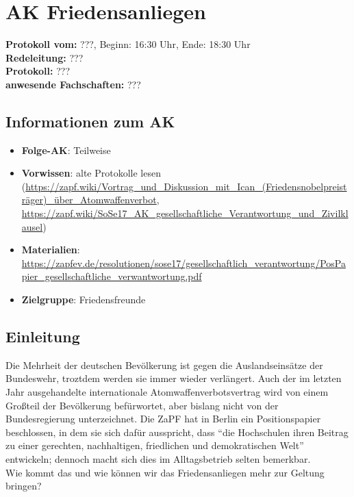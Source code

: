 
\section{AK Friedensanliegen}

	\textbf{Protokoll vom:} ???,
	Beginn: 16:30 Uhr,
	Ende: 18:30 Uhr \\
	\textbf{Redeleitung:} ??? \\
	\textbf{Protokoll:} ??? \\
	\textbf{anwesende Fachschaften:} ???

	\subsection*{Informationen zum AK}
		\begin{itemize}
			\item \textbf{Folge-AK}: Teilweise
			\item \textbf{Vorwissen}: alte Protokolle lesen (\url{https://zapf.wiki/Vortrag_und_Diskussion_mit_Ican_(Friedensnobelpreisträger)_über_Atomwaffenverbot}, \url{https://zapf.wiki/SoSe17_AK_gesellschaftliche_Verantwortung_und_Zivilklausel})
      		\item \textbf{Materialien}: \url{https://zapfev.de/resolutionen/sose17/gesellschaftlich_verantwortung/PosPapier_gesellschaftliche_verwantwortung.pdf}
			\item \textbf{Zielgruppe}: Friedensfreunde
		\end{itemize}

  \subsection{Einleitung}
    Die Mehrheit der deutschen Bevölkerung ist gegen die Auslandseinsätze der Bundeswehr, troztdem werden sie immer wieder verlängert. Auch der im letzten Jahr ausgehandelte internationale Atomwaffenverbotsvertrag wird von einem Großteil der Bevölkerung befürwortet, aber bislang nicht von der Bundesregierung unterzeichnet. Die ZaPF hat in Berlin ein Positionspapier beschlossen, in dem sie sich dafür ausspricht, dass ``die Hochschulen ihren Beitrag zu einer gerechten, nachhaltigen, friedlichen und demokratischen Welt'' entwickeln; dennoch macht sich dies im Alltagsbetrieb selten bemerkbar. \\

    Wie kommt das und wie können wir das Friedensanliegen mehr zur Geltung bringen?

